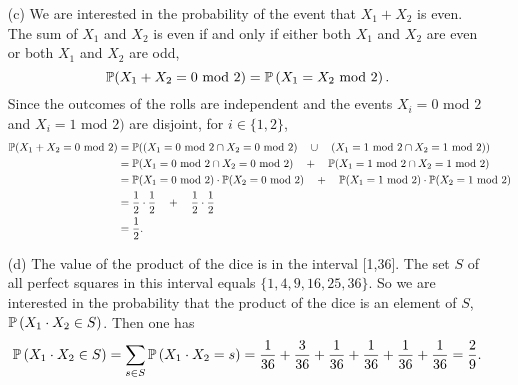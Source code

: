 \begin{enumerate}
  \item[(c)] We are interested in the probability of the event that $X_1 + X_2$
    is even. The sum of $X_1$ and $X_2$ is even if and only if either both $X_1$
    and $X_2$ are even or both $X_1$ and $X_2$ are odd,
    \[
      \mathbb{P}(X_1 + X_2 = 0 \text{  mod }2) = \mathbb{P}\left(X_1 = X_2 \text{  mod }2\right).
    \]
    Since the outcomes of the rolls are independent and  the events $X_i = 0 \text{  mod }2$ and $X_i = 1 \text{  mod }2)$ are disjoint, for $i \in \{ 1,2 \}$,
    \begin{align*}
      \mathbb{P}(X_1 + X_2 = 0 \text{  mod }2)
         &= \mathbb{P}((X_1 = 0 \text{  mod }2 \cap X_2 = 0 \text{  mod }2)  \quad \cup \quad (X_1 = 1 \text{  mod }2 \cap X_2 = 1 \text{  mod }2)) \\
         &= \mathbb{P}(X_1 = 0 \text{  mod }2 \cap X_2 = 0 \text{  mod }2)     \quad  +   \quad \mathbb{P}(X_1 = 1 \text{  mod }2 \cap X_2 = 1 \text{  mod }2) \\
         &= \mathbb{P}(X_1 = 0 \text{  mod }2) \cdot \mathbb{P}(X_2 = 0 \text{  mod }2)\quad  +  \quad \mathbb{P}(X_1 = 1 \text{  mod }2) \cdot \mathbb{P}(X_2 = 1 \text{  mod }2) \\
         &= \frac{1}{2} \cdot \frac{1}{2} \quad  +   \quad \frac{1}{2} \cdot \frac{1}{2} \\
         &= \frac{1}{2}.
  \end{align*}

  \item[(d)] The value of the product of the dice is in the interval [1,36]. The
    set $S$ of all perfect squares in this interval equals $\{ 1, 4, 9, 16, 25, 36 \}$.
    So we are interested in the probability that the product of the dice is an
    element of $S$, $\mathbb{P}\left(X_1 \cdot X_2 \in S\right)$. Then one has
    \[
      \mathbb{P}\left(X_1 \cdot X_2 \in S\right)
        = \sum_{s \in S}\mathbb{P}\left(X_1 \cdot X_2 = s\right)
        = \frac{1}{36} + \frac{3}{36} +  \frac{1}{36} +  \frac{1}{36} +  \frac{1}{36} +  \frac{1}{36}\\
        = \frac{2}{9}.
    \]
\end{enumerate}
